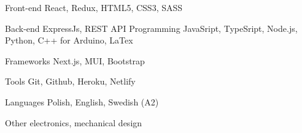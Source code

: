 

\begin{cvskills}

  \cvskill
    {Front-end} %
    {React, Redux, HTML5, CSS3, SASS} %

  \cvskill
    {Back-end} %
    {ExpressJs, REST API} %
  \cvskill
    {Programming} %
    {JavaSript, TypeSript, Node.js, Python, C++ for Arduino, LaTex} %

\cvskill
{Frameworks}
{Next.js, MUI, Bootstrap}

\cvskill
{Tools}
{Git, Github, Heroku, Netlify}

  \cvskill
    {Languages} %
    {Polish, English, Swedish (A2)} %

  \cvskill
    {Other} %
    {electronics, mechanical design} %

\end{cvskills}

